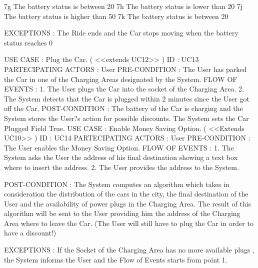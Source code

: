 7g The battery status is between 20%
7h The battery status is lower than 20%
7j The battery status is higher than 50%
7k The battery status is between 20%

EXCEPTIONS : 
The Ride ends and the Car stops moving when the battery status reaches 0%

USE CASE : Plug the Car.  ( <<extends UC12>> )
ID : UC13
PARTECIPATING ACTORS : User 
PRE-CONDITION : The User has parked the Car in one of the Charging Areas designated by the System. 
FLOW OF EVENTS :
1. The User plugs the Car into the socket of the Charging Area. 
2. The System detects that the Car is plugged within 2 minutes since the User got off the Car.
POST-CONDITION :  
The battery of the Car is charging and the System stores the User?s action for possible discounts.
The System sets the Car Plugged Field True.
USE CASE : Enable Money Saving Option. ( <<Extends UC10>> )
ID : UC14
PARTECIPATING ACTORS : User 
PRE-CONDITION : The User enables the Money Saving Option.
FLOW OF EVENTS : 
1. The System asks the User the address of his final destination showing a text box where to insert the address.
2. The User provides the address to the System.

POST-CONDITION :  
The System computes an algorithm which takes in consideration the distribution of the cars in the city, the final destination of the User and the availability of power plugs in the Charging Area. The result of this algorithm will be sent to the User providing him the address of the Charging Area where to leave the Car. 
(The User will still have to plug the Car in order to have a discount!)

EXCEPTIONS : 
If the Socket of the Charging Area has no more available plugs , the System informs the User and the Flow of Events starts from point 1.
